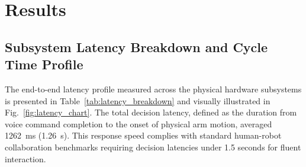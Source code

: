 \documentclass{svproc}
\begin{document}
\FloatBarrier
\section{Results}
\label{sec:results}

\subsection{Subsystem Latency Breakdown and Cycle Time Profile}
The end-to-end latency profile measured across the physical hardware subsystems is presented in Table~\ref{tab:latency_breakdown} and visually illustrated in Fig.~\ref{fig:latency_chart}. The total decision latency, defined as the duration from voice command completion to the onset of physical arm motion, averaged \SI{1262}{\milli\second} (\SI{1.26}{\second}). This response speed complies with standard human-robot collaboration benchmarks requiring decision latencies under 1.5 seconds for fluent interaction.

\begin{table}[htbp]
\caption{Measured End-to-End Latency Breakdown Across Hardware and Software Subsystems.}
\label{tab:latency_breakdown}
\centering
{}
\end{table}
\end{document}
